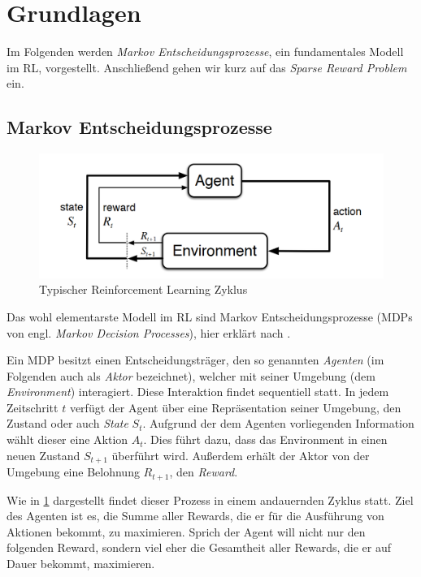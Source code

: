 \section{Grundlagen}
\label{sec:basics}

Im Folgenden werden \textit{Markov Entscheidungsprozesse}, ein fundamentales Modell im RL, vorgestellt. Anschließend gehen wir kurz auf das \textit{Sparse Reward Problem} ein.

\subsection{Markov Entscheidungsprozesse}
\label{sec:reinforcement}
\begin{figure}[h]
\includegraphics[width=\textwidth, keepaspectratio=true]{images/mdp.png}
\caption{Typischer Reinforcement Learning Zyklus} \label{img:rl_cycle}
\end{figure}
Das wohl elementarste Modell im RL sind Markov Entscheidungsprozesse (MDPs von engl. \textit{Markov Decision Processes}), hier erklärt nach \cite{deeplizard_markov_decision_processes}.

Ein MDP besitzt einen Entscheidungsträger, den so genannten \textit{Agenten} (im Folgenden auch als \textit{Aktor} bezeichnet), welcher mit seiner Umgebung (dem \textit{Environment}) interagiert. Diese Interaktion findet sequentiell statt. In jedem Zeitschritt $ t $ verfügt der Agent über eine Repräsentation seiner Umgebung, den Zustand oder auch \textit{State} $ S_t $. Aufgrund der dem Agenten vorliegenden Information wählt dieser eine Aktion $ A_t $. Dies führt dazu, dass das Environment in einen neuen Zustand $ S_{t+1} $ überführt wird. Außerdem erhält der Aktor von der Umgebung eine Belohnung $ R_{t+1} $, den \textit{Reward}.

Wie in \ref{img:rl_cycle} dargestellt findet dieser Prozess in einem andauernden Zyklus statt. Ziel des Agenten ist es, die Summe aller Rewards, die er für die Ausführung von Aktionen bekommt, zu maximieren. Sprich der Agent will nicht nur den folgenden Reward, sondern viel eher die Gesamtheit aller Rewards, die er auf Dauer bekommt, maximieren.

